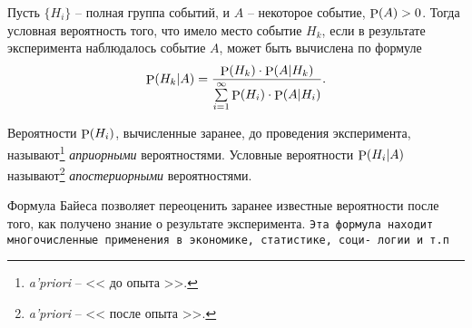 \begin{to_thr}
    Пусть $\{H_i\}$ -- полная группа событий, и $A$ -- некоторое событие, $\P (A) > 0$. Тогда условная вероятность того, что имело место событие $H_k$, если в результате эксперимента наблюдалось событие $A$, может быть вычислена по формуле
    \begin{equation}
        \P (H_k | A) = \frac{
        \P (H_k) \cdot \P (A | H_k)
        }{
        \sum\limits_{i=1}^{\infty} \P(H_i)  \cdot \P (A | H_i)
        }.
    \end{equation}
\end{to_thr}

\begin{to_def}
    Вероятности $\P (H_i)$, вычисленные заранее, до проведения эксперимента, называют\footnote{
        \textit{a'priori}  -- << до опыта >>.
    }  \textit{априорными} вероятностями. Условные вероятности $\P(H_i | A)$ называют\footnote{
        \textit{a'priori}  -- << после опыта >>.
    }  \textit{апостериорными} вероятностями.
\end{to_def}

Формула Байеса позволяет переоценить заранее известные вероятности после того, как получено знание о результате эксперимента. 
\texttt{Эта формула находит многочисленные применения в экономике, статистике, соци- логии и т.п}

